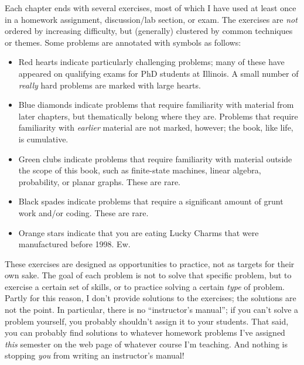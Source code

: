 Each chapter ends with several exercises, most of which I have used at least once in a homework assignment, discussion/lab section, or exam. The exercises are \textit{not} ordered by increasing difficulty, but (generally) clustered by common techniques or themes. Some problems are annotated with symbols as follows:
\begin{itemize}
\item {}Red hearts indicate particularly challenging problems; many of these have appeared on qualifying exams for PhD students at Illinois. A small number of \textit{really} hard problems are marked with large hearts.
\item {}Blue diamonds indicate problems that require familiarity with material from later chapters, but thematically belong where they are. Problems that require familiarity with \textit{earlier} material are not marked, however; the book, like life, is cumulative.
\item {}Green clubs indicate problems that require familiarity with material outside the scope of this book, such as finite-state machines, linear algebra, probability, or planar graphs. These are rare.
\item {}Black spades indicate problems that require a significant amount of grunt work and/or coding. These are rare.
\item {}Orange stars indicate that you are eating Lucky Charms that were manufactured before 1998. Ew.
\end{itemize}
These exercises are designed as opportunities to practice, not as targets for their own sake. The goal of each problem is not to solve that specific problem, but to exercise a certain set of skills, or to practice solving a certain \textit{type} of problem. Partly for this reason, I don’t provide solutions to the exercises; the solutions are not the point. In particular, there is no “instructor’s manual”; if you can’t solve a problem yourself, you probably shouldn’t assign it to your students. That said, you can probably find solutions to whatever homework problems I’ve assigned \textit{this} semester on the web page of whatever course I’m teaching. And nothing is stopping \textit{you} from writing an instructor’s manual!

